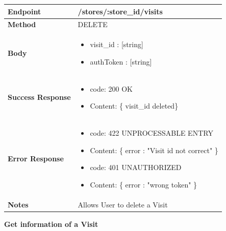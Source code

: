 \documentclass[a4paper, 12pt, oneside, table]{article}
\begin{document}
\begin{tabularx}{\linewidth}{| l | X |}
    
    \hline
     \textbf{Endpoint} & /stores/:store\_id/visits \\
    

    \hline
    \textbf{Method}  & DELETE   \\
    
    \hline
    \textbf{Body}  & \parbox{0.7\textwidth}{ \begin{itemize}[label={}] 
                \item visit\_id : [string]
                 \item authToken : [string]
               \end{itemize}}\\
    
    \hline
    \textbf{Success Response} & \parbox{0.7\textwidth}{ \begin{itemize}[label={}] 
                \item code: 200 OK
                 \item Content: \{ visit\_id deleted\}
               \end{itemize}}\\
    
    \hline
    
    \hline
        \textbf{Error Response} & \parbox{0.7\textwidth}{ \begin{itemize}[label={}] 
                \item code: 422 UNPROCESSABLE ENTRY
                 \item Content: \{ error : "Visit id not correct" \}
                  \item code: 401 UNAUTHORIZED
                 \item Content: \{ error : "wrong token" \}
               \end{itemize}}\\
    
    \hline
    \textbf{Notes} & Allows User to delete a Visit \\

    \hline
    
\end{tabularx}

\textbf{Get information of a Visit}
\vspace{-2em}
\begin{tabularx}{0.8\textwidth} { 
  | >{\raggedright\arraybackslash}X 
  | >{\centering\arraybackslash}X 
  | >{\raggedleft\arraybackslash}X | }
 \hline

 \hline
 
\hline
\hline
 
\hline
\end{tabularx}
\end{document}
